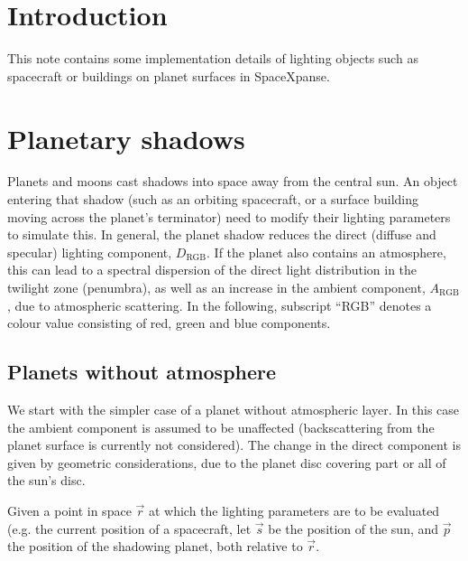 \documentclass[a4paper]{article}
\begin{document}



\newcommand{\vR}[1]{\ensuremath{\vec{R}_{#1}}}
\newcommand{\nR}[1]{\ensuremath{|\vR{#1}|}}
\newcommand{\mat}[1]{\ensuremath{\mathsf{#1}}}

\maketitle

\section{Introduction}
This note contains some implementation details of lighting objects such as spacecraft or buildings on planet surfaces in SpaceXpanse.

\section{Planetary shadows}
Planets and moons cast shadows into space away from the central sun. An object entering that shadow (such as an orbiting spacecraft, or a surface building moving across the planet's terminator) need to modify their lighting parameters to simulate this. In general, the planet shadow reduces the direct (diffuse and specular) lighting component, $D_\text{RGB}$. If the planet also contains an atmosphere, this can lead to a spectral dispersion of the direct light distribution in the twilight zone (penumbra), as well as an increase in the ambient component, $A_\text{RGB}$, due to atmospheric scattering. In the following, subscript ``RGB'' denotes a colour value consisting of red, green and blue components.

\subsection{Planets without atmosphere}
We start with the simpler case of a planet without atmospheric layer. In this case the ambient component is assumed to be unaffected (backscattering from the planet surface is currently not considered). The change in the direct component is given by geometric considerations, due to the planet disc covering part or all of the sun's disc.

Given a point in space $\vec{r}$ at which the lighting parameters are to be evaluated (e.g. the current position of a spacecraft, let $\vec{s}$ be the position of the sun, and $\vec{p}$ the position of the shadowing planet, both relative to $\vec{r}$.
\end{document}
